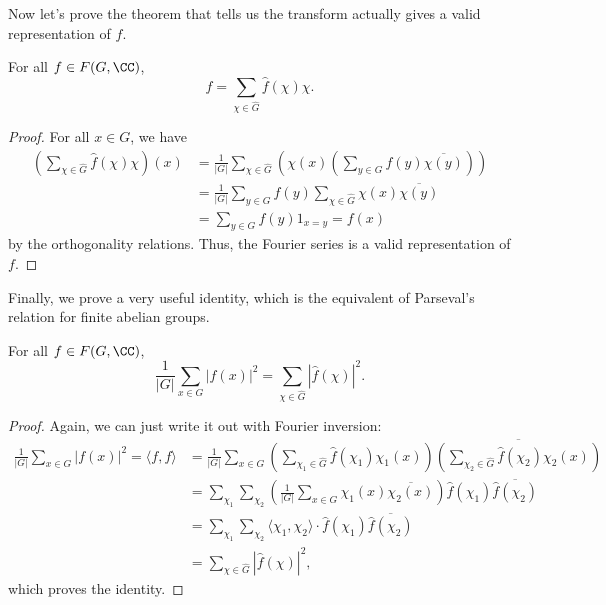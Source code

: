 \documentclass{scrartcl}
\begin{document}
Now let's prove the theorem that tells us the transform actually gives a valid representation of $f$. 

\begin{theorem}
	For all $f\in F(G, \CC)$, 
	$$f = \sum_{\chi \in \widehat{G}} \widehat{f}(\chi) \chi.$$
\end{theorem}

\begin{proof}
	For all $x\in G$, we have 
	\begin{align*}
		\left(\sum_{\chi \in \widehat{G}} \widehat{f}(\chi)\chi\right)(x) 
		&= \frac{1}{|G|} \sum_{\chi \in \widehat{G}} \left(\chi(x) \left(\sum_{y\in G}f(y)\overline{\chi(y)}\right)\right) \\
		&= \frac{1}{|G|} \sum_{y\in G} f(y) \sum_{\chi \in \widehat{G}} \chi(x)\overline{\chi(y)} \\
		&= \sum_{y\in G}f(y) 1_{x=y} = f(x)
	\end{align*}
	by the orthogonality relations. Thus, the Fourier series is a valid representation of $f$. 
\end{proof}

Finally, we prove a very useful identity, which is the equivalent of Parseval's relation for finite 
abelian groups. 

\begin{theorem}
	For all $f\in F(G, \CC)$, 
	$$\frac{1}{|G|} \sum_{x\in G} |f(x)|^2 = \sum_{\chi \in \widehat{G}} |\widehat{f}(\chi)|^2.$$
\end{theorem}

\begin{proof}
	Again, we can just write it out with Fourier inversion: 
	\begin{align*}
		\frac{1}{|G|} \sum_{x\in G}|f(x)|^2 = \langle f, f\rangle  &= 
		\frac{1}{|G|} \sum_{x\in G}\left(\sum_{\chi_1\in \widehat{G}} \widehat{f}(\chi_1)\chi_1(x) \right) 
		\overline{\left(\sum_{\chi_2\in \widehat{G}} \widehat{f}(\chi_2)\chi_2(x) \right)} \\
		&= \sum_{\chi_1} \sum_{\chi_2} \left(\frac{1}{|G|} \sum_{x\in G} \chi_1(x)\overline{\chi_2(x)}\right) 
		\widehat{f}(\chi_1)\overline{\widehat{f}(\chi_2)} \\
		&= \sum_{\chi_1} \sum_{\chi_2} \langle \chi_1, \chi_2\rangle \cdot \widehat{f}(\chi_1)
		\overline{\widehat{f}(\chi_2)} \\
		&= \sum_{\chi \in \widehat{G}}|\widehat{f}(\chi)|^2,
	\end{align*}
	which proves the identity. 
\end{proof}
\end{document}
